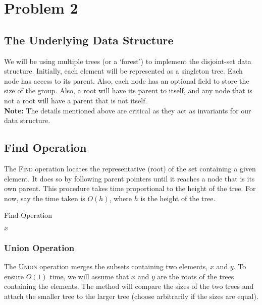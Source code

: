 \documentclass[a4paper]{article}
\begin{document}
\newpage
\section*{Problem 2}
\subsection*{The Underlying Data Structure}
We will be using multiple trees (or a `forest') to implement the disjoint-set data structure. Initially, each element will be represented as a singleton tree. Each node has access to its parent. Also, each node has an optional field to store the size of the group. Also, a root will have its parent to itself, and any node that is not a root will have a parent that is not itself.\\

\noindent \textbf{Note:} The details mentioned above are critical as they act as invariants for our data structure. 

\subsection*{Find Operation}
The \textsc{Find} operation locates the representative (root) of the set containing a given element. It does so by following parent pointers until it reaches a node that is its own parent. This procedure takes time proportional to the height of the tree. For now, say the time taken is $O(h)$, where $h$ is the height of the tree.

\begin{algorithm}
\caption{Find Operation}
\begin{algorithmic}[1]
        \State \Return {}
    \Else
        \State \Return $x$
    \EndIf
\EndFunction
\end{algorithmic}
\end{algorithm}

\subsubsection*{Union Operation}
The \textsc{Union} operation merges the subsets containing two elements, $x$ and $y$. To ensure $O(1)$ time, we will assume that $x$ and $y$ are the roots of the trees containing the elements. The method will compare the sizes of the two trees and attach the smaller tree to the larger tree (choose arbitrarily if the sizes are equal).
\end{document}

